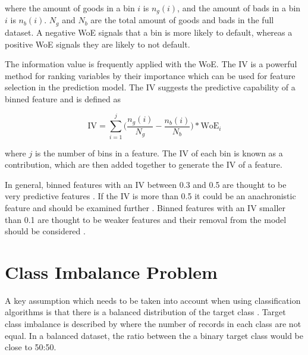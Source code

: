 where the amount of goods in a bin $i$ is $n_g(i)$, and the amount of bads in a bin $i$ is $n_b(i)$. $N_g$ and $N_b$ are the total amount of goods and bads in the full dataset. A negative WoE signals that a bin is more likely to default, whereas a positive WoE signals they are likely to not default.

The information value is frequently applied with the WoE. The IV is a powerful method for ranking variables by their importance which can be used for feature selection in the prediction model. The IV suggests the predictive capability of a binned feature and is defined as  
 
\begin{equation} \label{eq:informatoValue}
\text{IV} =  \sum\limits_{i=1}^j \bigg(\frac{n_g(i)}{N_g} -   \frac{n_b(i)}{N_b}\bigg) * \text{WoE$_i$}
\end{equation}

where $j$ is the number of bins in a feature. The IV of each bin is known as a contribution, which are then added together to generate the IV of a feature.

In general, binned features with an IV between 0.3 and 0.5 are thought to be very predictive features \citep{mays_credit_2004}. If the IV is more than 0.5 it could be an anachronistic feature and should be examined further \citep{siddiqi_credit_2012}. Binned features with an IV smaller than 0.1 are thought to be weaker features and their removal from the model should be considered \citep{anderson_credit_2007}.

\begin{comment}
\subsection{Correlation-based Feature Selection}
\subsection{Information Gain}
\subsection{Coarse Classification/ Binning}
\end{comment}

\section{Class Imbalance Problem}\label{sec:imBalance}
A key assumption which needs to be taken into account when using classification algorithms is that there is a balanced distribution of the target class \citep{japkowicz_class_2000}. Target class imbalance is described by  \citep{chawla_smote:_2002} where the number of records in each class are not equal. In a balanced dataset, the ratio between the a binary target class would be close to 50:50. 

